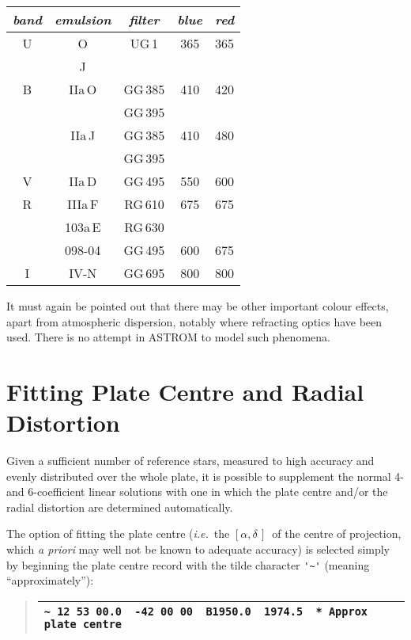 \documentclass[twoside,11pt]{article}
\newcommand{\xlabel}[1]{}
\renewcommand{\_}{\texttt{\symbol{95}}}
\newcommand{\radec}     {$[\alpha,\delta\,]$}
\begin{document}
\begin{center}
\begin{tabular}{|c|c|c||c|c|}
\hline
\textit{band} & \textit{emulsion} & \textit{filter} & \textit{blue} & \textit{red} \\
\hline \hline
U & O & UG\,1 & 365 & 365 \\
  & J &       &     &     \\
\hline
B & IIa\,O & GG\,385 & 410 & 420 \\
  &        & GG\,395 &     &     \\
\cline{2-5}
  & IIa\,J & GG\,385 & 410 & 480 \\
  &        & GG\,395 &     &     \\
\hline
V & IIa\,D & GG\,495 & 550 & 600 \\
\hline
R & IIIa\,F & RG\,610 & 675 & 675 \\
  & 103a\,E & RG\,630 &     &     \\
\cline{3-5}
  & 098-04 & GG\,495 & 600 & 675 \\
\hline
I & IV-N & GG\,695 & 800 & 800 \\
\hline
\end{tabular}
\end{center}

It must again be pointed out that there may be other important
colour effects, apart from atmospheric dispersion, notably where
refracting optics have been used.  There is no attempt in ASTROM
to model such phenomena.

\section{\xlabel{fitting_plate_centre_and_radial_distortion}%
Fitting Plate Centre and Radial Distortion}
\label{fitting_plate_centre_and_radial_distortion}

Given a sufficient number of reference stars, measured to high accuracy
and evenly distributed over the whole plate, it is possible to supplement
the normal 4- and 6-coefficient linear solutions with one in which the
plate centre and/or the radial distortion are determined automatically.

The option of fitting the plate centre (\emph{i.e.}\ the \radec\ of the
centre of projection, which \textit{a priori} may well not be known to
adequate accuracy) is selected simply by beginning the plate centre record
with the tilde character \verb|'~'| (meaning ``approximately''):

\goodbreak
\begin{quote}
\begin{tabular}{|l|}
\hline
\verb|~ 12 53 00.0  -42 00 00  B1950.0  1974.5  * Approx plate centre| \\
\hline
\end{tabular}
\end{quote}
\end{document}
